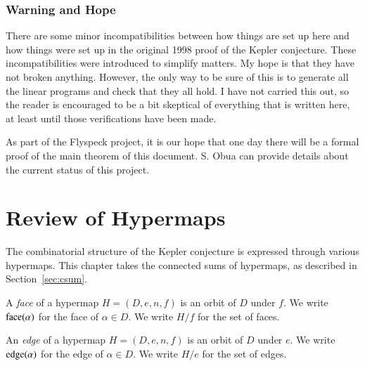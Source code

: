 \subsubsection{Warning and Hope}

There are some minor incompatibilities between how things are set
up here and how things were set up in the original 1998 proof of
the Kepler conjecture.  These incompatibilities were introduced to
simplify matters.  My hope is that they have not broken anything.
However, the only way to be sure of this is to generate all the
linear programs and check that they all hold.  I have not carried
this out, so the reader is encouraged to be a bit skeptical of
everything that is written here, at least until those
verifications have been made.

As part of the Flyspeck project, it is our hope that one day there
will be a formal proof of the main theorem of this document.  S.
Obua can provide details about the current status of this project.

\section{Review of Hypermaps}

The combinatorial structure of the Kepler conjecture is expressed
through various hypermaps.   This chapter takes
the connected sums of hypermaps, as described in Section~\ref{sec:csum}.

%
%
%

\begin{definition}  A {\it face} of a hypermap $H=(D,e,n,f)$ is an orbit of $D$
under $f$.  We write ${\operatorname{face}}(\alpha)$ for the face of
$\alpha\in D$.  We write $H/f$ for the set of faces.
\end{definition}

\begin{definition}  An {\it edge} of a hypermap $H=(D,e,n,f)$ is an orbit of $D$
under $e$.  We write ${\operatorname{edge}}(\alpha)$ for the edge of
$\alpha\in D$.  We write $H/e$ for the set of edges.
\end{definition}

